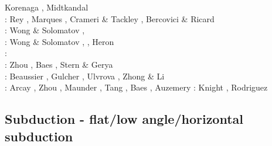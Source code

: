 \begin{scriptsize}
                      Korenaga \cite{kore13}, Midtkandal \etal \cite{mibg13}\\
\twothousandfourteen: Rey \etal \cite{recf14}, Marques \etal \cite{macg14},
                      Crameri \& Tackley \cite{crta14}, Bercovici \& Ricard \cite{beri14}\\
\twothousandfifteen: Wong \& Solomatov \cite{woso15}, \cite{matv15}
                     \cite{pebu15}\cite{vapm15}\cite{legu15}\cite{gesb15}\\
\twothousandsixteen: Wong \& Solomatov \cite{woso16a}, \cite{crta16}
                     \cite{maka16}\cite{bags16}, 
                     Heron \etal \cite{heps16}\\
\twothousandseventeen: \cite{magm17}\\
\twothousandeighteen: Zhou \etal \cite{zhlg18}, Baes \etal \cite{basq18}, Stern \& Gerya \cite{stge18} \\
\twothousandnineteen: Beaussier \etal \cite{begb19}, Gulcher \etal \cite{gubg19}, 
                      Ulvrova \etal \cite{ulcw19}, Zhong \& Li \cite{zhli19}\\
\twothousandtwenty: Arcay \etal \cite{arla20}, Zhou \etal \cite{zhlg20}, 
                    Maunder \etal \cite{mapg20}, Tang \etal \cite{tawm20}, 
                    Baes \etal \cite{basg20b}, Auzemery \etal \cite{auwy20}
\twothousandtwentyone: Knight \etal \cite{kndc21}, Rodriguez \etal \cite{roac21}
\end{scriptsize}

\subsection{Subduction - flat/low angle/horizontal subduction}

